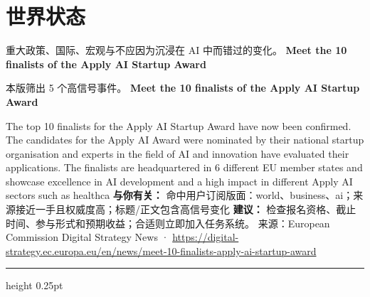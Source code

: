 \documentclass[10.5pt]{ctexart}
\begin{document}
\section*{世界状态}
{\color{ormuted} 重大政策、国际、宏观与不应因为沉浸在 AI 中而错过的变化。}
\vspace{2mm}
{\LARGE\bfseries Meet the 10 finalists of the Apply AI Startup Award}\par
\vspace{1mm}
{\color{ormuted} 本版筛出 5 个高信号事件。}
\vspace{3mm}
{\Large\bfseries Meet the 10 finalists of the Apply AI Startup Award}\par
The top 10 finalists for the Apply AI Startup Award have now been confirmed. The candidates for the Apply AI Award were nominated by their national startup organisation and experts in the field of AI and innovation have evaluated their applications. The finalists are headquartered in 6 different EU member states and showcase excellence in AI development and a high impact in different Apply AI sectors such as healthca
\textbf{与你有关：} 命中用户订阅版面：world、business、ai；来源接近一手且权威度高；标题/正文包含高信号变化
\textbf{建议：} 检查报名资格、截止时间、参与形式和预期收益；合适则立即加入任务系统。
{\footnotesize\color{ormuted} 来源：European Commission Digital Strategy News · \url{https://digital-strategy.ec.europa.eu/en/news/meet-10-finalists-apply-ai-startup-award}}
\vspace{4mm}
\hrule height 0.25pt
\vspace{3mm}
\end{document}

